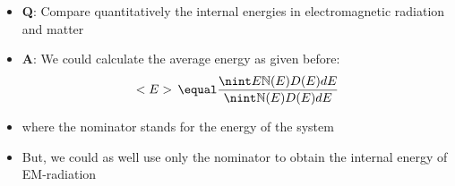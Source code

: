 \begin{frame}
\frametitle{\texorpdfstring{\culine[\sectiontitleulinecolor]{\sectiontitle}}{\sectiontitle} }

\begin{itemize}[itemsep=3mm]
	\item \textbf{Q}: Compare quantitatively the internal energies in electromagnetic radiation and matter
\item \textbf{A}: We could calculate the average energy as given before: 
\[
<E>\,  \equal  \frac{\nint E  \mathbb{N} (E) D(E) d E}{\nint  \mathbb{N} (E) D(E) d E}
\]
\item[] where the nominator stands for the energy of the system  

\item But, we could as well use only the nominator to obtain the internal energy of EM-radiation 

\end{itemize}



\endofslide 
\end{frame}

